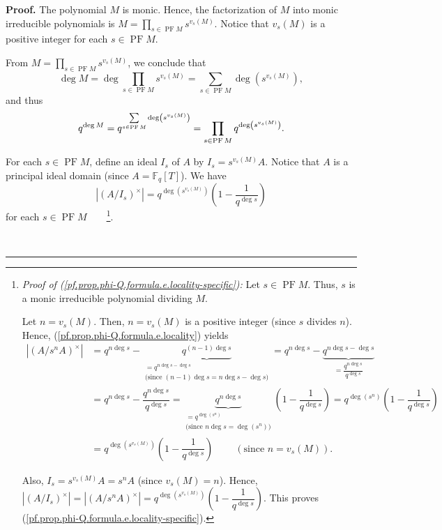 \documentclass[numbers=enddot,12pt,final,onecolumn,notitlepage]{scrartcl}%
\theoremstyle{definition}
\newenvironment{proof}[1][Proof]{\noindent\textbf{#1.} }{\ \rule{0.5em}{0.5em}}
\let\sumnonlimits\sum
\let\prodnonlimits\prod
\renewcommand{\sum}{\sumnonlimits\limits}
\renewcommand{\prod}{\prodnonlimits\limits}
\begin{document}
\begin{proof}
The polynomial $M$ is monic. Hence, the factorization of $M$ into monic
irreducible polynomials is $M=\prod_{s\in\operatorname*{PF}M}s^{v_{s}\left(
M\right)  }$. Notice that $v_{s}\left(  M\right)  $ is a positive integer for
each $s\in\operatorname*{PF}M$.

From $M=\prod_{s\in\operatorname*{PF}M}s^{v_{s}\left(  M\right)  }$, we
conclude that%
\[
\deg M=\deg\prod_{s\in\operatorname*{PF}M}s^{v_{s}\left(  M\right)  }%
=\sum_{s\in\operatorname*{PF}M}\deg\left(  s^{v_{s}\left(  M\right)  }\right)
,
\]
and thus%
\begin{equation}
q^{\deg M}=q^{\sum_{s\in\operatorname*{PF}M}\deg\left(  s^{v_{s}\left(
M\right)  }\right)  }=\prod\limits_{s\in\operatorname*{PF}M}q^{\deg\left(
s^{v_{s}\left(  M\right)  }\right)  }. \label{pf.prop.phi-Q.formula.e.qdegM}%
\end{equation}


For each $s\in\operatorname*{PF}M$, define an ideal $I_{s}$ of $A$ by
$I_{s}=s^{v_{s}\left(  M\right)  }A$. Notice that $A$ is a principal ideal
domain (since $A=\mathbb{F}_{q}\left[  T\right]  $). We have%
\begin{equation}
\left\vert \left(  A/I_{s}\right)  ^{\times}\right\vert =q^{\deg\left(
s^{v_{s}\left(  M\right)  }\right)  }\left(  1-\dfrac{1}{q^{\deg s}}\right)
\label{pf.prop.phi-Q.formula.e.locality-specific}%
\end{equation}
for each $s\in\operatorname*{PF}M$\ \ \ \ \footnote{\textit{Proof of
(\ref{pf.prop.phi-Q.formula.e.locality-specific}):} Let $s\in
\operatorname*{PF}M$. Thus, $s$ is a monic irreducible polynomial dividing
$M$.
\par
Let $n=v_{s}\left(  M\right)  $. Then, $n=v_{s}\left(  M\right)  $ is a
positive integer (since $s$ divides $n$). Hence,
(\ref{pf.prop.phi-Q.formula.e.locality}) yields
\begin{align*}
\left\vert \left(  A/s^{n}A\right)  ^{\times}\right\vert  &  =q^{n\deg
s}-\underbrace{q^{\left(  n-1\right)  \deg s}}_{\substack{=q^{n\deg s-\deg
s}\\\text{(since }\left(  n-1\right)  \deg s=n\deg s-\deg s\text{)}}}=q^{n\deg
s}-\underbrace{q^{n\deg s-\deg s}}_{=\dfrac{q^{n\deg s}}{q^{\deg s}}}\\
&  =q^{n\deg s}-\dfrac{q^{n\deg s}}{q^{\deg s}}=\underbrace{q^{n\deg s}%
}_{\substack{=q^{\deg\left(  s^{n}\right)  }\\\text{(since }n\deg
s=\deg\left(  s^{n}\right)  \text{)}}}\left(  1-\dfrac{1}{q^{\deg s}}\right)
=q^{\deg\left(  s^{n}\right)  }\left(  1-\dfrac{1}{q^{\deg s}}\right) \\
&  =q^{\deg\left(  s^{v_{s}\left(  M\right)  }\right)  }\left(  1-\dfrac
{1}{q^{\deg s}}\right)  \ \ \ \ \ \ \ \ \ \ \left(  \text{since }%
n=v_{s}\left(  M\right)  \right)  .
\end{align*}
\par
Also, $I_{s}=s^{v_{s}\left(  M\right)  }A=s^{n}A$ (since $v_{s}\left(
M\right)  =n$). Hence, $\left\vert \left(  A/I_{s}\right)  ^{\times
}\right\vert =\left\vert \left(  A/s^{n}A\right)  ^{\times}\right\vert
=q^{\deg\left(  s^{v_{s}\left(  M\right)  }\right)  }\left(  1-\dfrac
{1}{q^{\deg s}}\right)  $. This proves
(\ref{pf.prop.phi-Q.formula.e.locality-specific}).}.


\end{proof}
\end{document}
